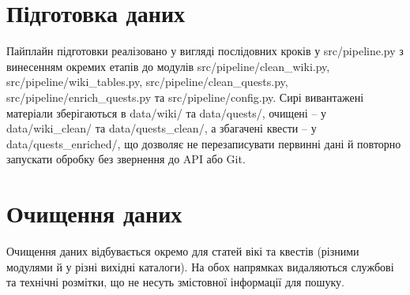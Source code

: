 \section{Підготовка даних}

Пайплайн підготовки реалізовано у вигляді послідовних кроків у src/pipeline.py з винесенням окремих етапів до модулів src/pipeline/clean\_wiki.py, src/pipeline/wiki\_tables.py, src/pipeline/clean\_quests.py, src/pipeline/enrich\_quests.py та src/pipeline/config.py. Сирі вивантажені матеріали зберігаються в data/wiki/ та data/quests/, очищені -- у data/wiki\_clean/ та data/quests\_clean/, а збагачені квести -- у data/quests\_enriched/, що дозволяє не перезаписувати первинні дані й повторно запускати обробку без звернення до API або Git.


\section{Очищення даних}

Очищення даних відбувається окремо для статей вікі та квестів (різними модулями й у різні вихідні каталоги). На обох напрямках видаляються службові та технічні розмітки, що не несуть змістовної інформації для пошуку.

